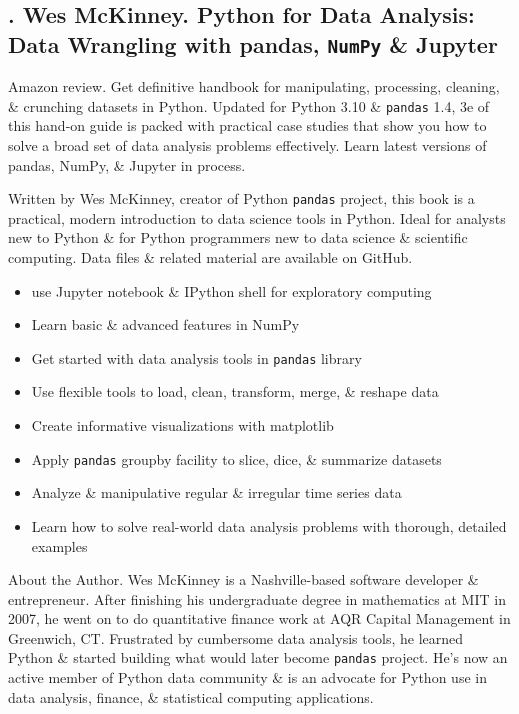 \documentclass{article}
\begin{document}
\subsection{\cite{McKinney2022}. {\sc Wes McKinney}. Python for Data Analysis: Data Wrangling with pandas, {\tt NumPy} \& Jupyter}
{}

{\sf Amazon review.} Get definitive handbook for manipulating, processing, cleaning, \& crunching datasets in Python. Updated for Python 3.10 \& {\tt pandas} 1.4, 3e of this hand-on guide is packed with practical case studies that show you how to solve a broad set of data analysis problems effectively. Learn latest versions of pandas, NumPy, \& Jupyter in process.

Written by {\sc Wes McKinney}, creator of Python {\tt pandas} project, this book is a practical, modern introduction to data science tools in Python. Ideal for analysts new to Python \& for Python programmers new to data science \& scientific computing. Data files \& related material are available on GitHub.
\begin{itemize}
	\item use Jupyter notebook \& IPython shell for exploratory computing
	\item Learn basic \& advanced features in NumPy
	\item Get started with data analysis tools in {\tt pandas} library
	\item Use flexible tools to load, clean, transform, merge, \& reshape data
	\item Create informative visualizations with matplotlib
	\item Apply {\tt pandas} groupby facility to slice, dice, \& summarize datasets
	\item Analyze \& manipulative regular \& irregular time series data
	\item Learn how to solve real-world data analysis problems with thorough, detailed examples
\end{itemize}
{\sf About the Author.} {\sc Wes McKinney} is a Nashville-based software developer \& entrepreneur. After finishing his undergraduate degree in mathematics at MIT in 2007, he went on to do quantitative finance work at AQR Capital Management in Greenwich, CT. Frustrated by cumbersome data analysis tools, he learned Python \& started building what would later become {\tt pandas} project. He's now an active member of Python data community \& is an advocate for Python use in data analysis, finance, \& statistical computing applications.
\end{document}
